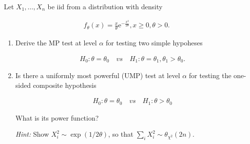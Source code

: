 
\begin{exercise}

Let $X_1, \dots, X_n$ be iid from a distribution with density

\begin{align*}
    f_\theta(x) = \frac{x}{\theta} \mathrm e^{-\frac{x^2}{2 \theta}},
    x \geq 0,
    \theta > 0.
\end{align*}

\begin{enumerate}[label = (\alph*)]

    \item Derive the MP test at level $\alpha$ for testing two simple hypoheses
    
    \begin{align*}
        H_0: \theta = \theta_0
        \quad
        \textit{vs}
        \quad
        H_1: \theta = \theta_1, \theta_1 > \theta_0.
    \end{align*}

    \item Is there a uniformly most powerful (UMP) test at level $\alpha$ for testing the one-sided composite hypothesis
    
    \begin{align*}
        H_0: \theta = \theta_0
        \quad
        \textit{vs}
        \quad
        H_1: \theta > \theta_0
    \end{align*}

    What is its power function?

    \textit{Hint:}
    Show $X_i^2 \sim \exp(1 / 2 \theta)$, so that $\sum_i X_i^2 \sim \theta_{\chi^2}(2 n)$.

\end{enumerate}

\end{exercise}


\begin{solution}

\phantom{}

\end{solution}

